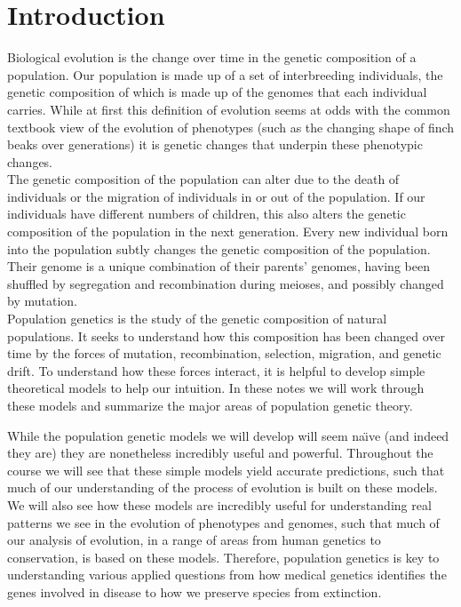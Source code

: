 \chapter{Introduction}
 Biological evolution is the change over time in the genetic composition of a population.\cite{DobzhanskyBook} Our population is made up of a set of interbreeding individuals, the genetic composition of which is made up of the  genomes that each individual carries.  While at first this definition of evolution seems at odds with the
common textbook view of the evolution of phenotypes (such as the changing shape
of finch beaks over generations) it is genetic changes that underpin these
phenotypic changes.  \\

The genetic composition of the population can alter due to the death of individuals or the migration of individuals in or out
of the population. If our individuals have different numbers of children, this
also alters the genetic composition of the population in the next generation.
Every new individual born into the population subtly changes the genetic
composition of the population. Their genome is a unique combination of their
parents' genomes, having been shuffled by segregation and recombination during
meioses, and possibly changed by mutation. \\

Population genetics is the study of the genetic composition of natural
populations. It seeks to understand how this composition has been changed over
time by the forces of mutation, recombination, selection, migration, and
genetic drift.  To understand how these forces interact, it is helpful to
develop simple theoretical models to help our intuition. In these notes we will
work through these models and summarize the major areas of population genetic
theory.



While the population genetic models we will develop will seem na\"{\i}ve (and indeed they are) they are
nonetheless incredibly useful and powerful. Throughout the course we will see
that these simple models yield accurate predictions, such that much of our
understanding of the process of evolution is built on these models. We will
also see how these models are incredibly useful for understanding real patterns
we see in the evolution of phenotypes and genomes, such that much of our
analysis of evolution, in a range of areas from human genetics to conservation,
is based on these models. Therefore, population genetics is key to
understanding various applied questions from how medical genetics identifies
the genes involved in disease to how we preserve species from extinction. 

